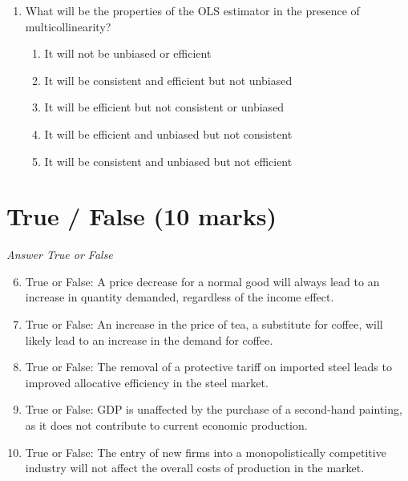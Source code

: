 \documentclass[12pt]{article}
\begin{document}
\begin{enumerate}[label=\arabic*.]
\begin{enumerate}[label=(\alph*)]
    \item Overproduction and wastage of crops
    \item Lack of alternative employment
    \item Excessive government intervention in agriculture
    \item Inefficient farming methods
    \item Low income of farmers
\end{enumerate}
\item What will be the properties of the OLS estimator in the presence of multicollinearity?
\begin{enumerate}[label=(\alph*)]
    \item It will not be unbiased or efficient
    \item It will be consistent and efficient but not unbiased
    \item It will be efficient but not consistent or unbiased
    \item It will be efficient and unbiased but not consistent
    \item It will be consistent and unbiased but not efficient
\end{enumerate}
\end{enumerate}

\section*{True / False (10 marks)}
\textit{Answer True or False}
\begin{enumerate}[label=\arabic*.]
\setcounter{enumi}{5}
\item True or False: A price decrease for a normal good will always lead to an increase in quantity demanded, regardless of the income effect.
\item True or False: An increase in the price of tea, a substitute for coffee, will likely lead to an increase in the demand for coffee.
\item True or False: The removal of a protective tariff on imported steel leads to improved allocative efficiency in the steel market.
\item True or False: GDP is unaffected by the purchase of a second-hand painting, as it does not contribute to current economic production.
\item True or False: The entry of new firms into a monopolistically competitive industry will not affect the overall costs of production in the market.
\end{enumerate}
\end{document}
